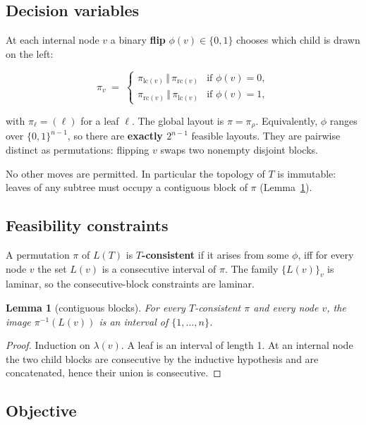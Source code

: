 \documentclass[11pt]{article}
\theoremstyle{plain}
\newtheorem{lemma}[theorem]{Lemma}
\newcommand{\lc}{\mathrm{lc}}
\newcommand{\rc}{\mathrm{rc}}
\begin{document}
\subsection{Decision variables}

At each internal node \(v\) a binary \textbf{flip} \(\phi(v) \in \{0,1\}\)
chooses which child is drawn on the left:

\[
\pi_v \;=\;
\begin{cases}
\pi_{\lc(v)}\,\Vert\,\pi_{\rc(v)} & \text{if }\phi(v)=0,\\
\pi_{\rc(v)}\,\Vert\,\pi_{\lc(v)} & \text{if }\phi(v)=1,
\end{cases}
\]

with \(\pi_\ell = (\ell)\) for a leaf \(\ell\). The global layout is
\(\pi = \pi_\rho\). Equivalently, \(\phi\) ranges over \(\{0,1\}^{n-1}\), so
there are \textbf{exactly \(2^{n-1}\)} feasible layouts. They are pairwise
distinct as permutations: flipping \(v\) swaps two nonempty disjoint blocks.

No other moves are permitted. In particular the topology of \(T\) is immutable:
leaves of any subtree must occupy a contiguous block of \(\pi\)
(Lemma~\ref{lem:contig}).

\subsection{Feasibility constraints}

A permutation \(\pi\) of \(L(T)\) is \textbf{\(T\)-consistent} if it arises from
some \(\phi\), iff for every node \(v\) the set \(L(v)\) is a consecutive
interval of \(\pi\). The family \(\{L(v)\}_v\) is laminar, so the
consecutive-block constraints are laminar.

\begin{lemma}[contiguous blocks]\label{lem:contig}
For every \(T\)-consistent \(\pi\) and every node \(v\), the image
\(\pi^{-1}(L(v))\) is an interval of \(\{1,\dots,n\}\).
\end{lemma}

\begin{proof}
Induction on \(\lambda(v)\). A leaf is an interval of length 1. At an internal
node the two child blocks are consecutive by the inductive hypothesis and are
concatenated, hence their union is consecutive.
\end{proof}

\subsection{Objective}
\end{document}
